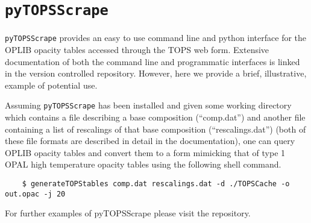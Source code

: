 \section{\texttt{pyTOPSScrape}}\label{apx:pytopsscrape}
\texttt{pyTOPSScrape} provides an easy to use command line and python interface
for the OPLIB opacity tables accessed through the TOPS web form. Extensive
documentation of both the command line and programmatic interfaces is linked
in the version controlled repository. However, here we provide a brief,
illustrative, example of potential use.

Assuming \texttt{pyTOPSScrape} has been installed and given some working
directory which contains a file describing a base composition (``comp.dat'')
and another file containing a list of rescalings of that base composition
(``rescalings.dat'') (both of these file formats are described in detail in the
documentation), one can query OPLIB opacity tables and convert them to a form
mimicking that of type 1 OPAL high temperature opacity tables using the
following shell command.

\begin{verbatim}
	$ generateTOPStables comp.dat rescalings.dat -d ./TOPSCache -o out.opac -j 20
\end{verbatim}

\noindent For further examples of pyTOPSScrape please visit the repository.
